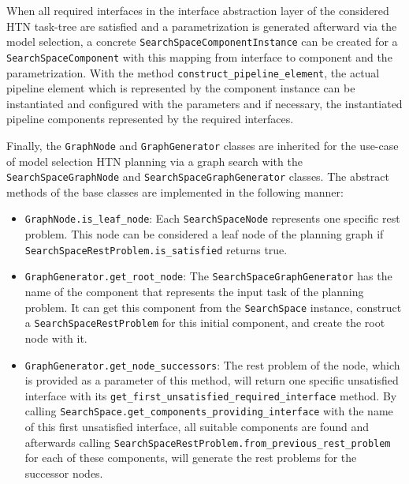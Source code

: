 When all required interfaces in the interface abstraction layer of the considered HTN task-tree are satisfied and a parametrization is generated afterward via the model selection, a concrete \texttt{SearchSpaceComponentInstance} can be created for a \texttt{SearchSpaceComponent} with this mapping from interface to component and the parametrization.
With the method \texttt{construct\_pipeline\_element}, the actual pipeline element which is represented by the component instance can be instantiated and configured with the parameters and if necessary, the instantiated pipeline components represented by the required interfaces.

Finally, the \texttt{GraphNode} and \texttt{GraphGenerator} classes are inherited for the use-case of model selection HTN planning via a graph search with the \texttt{SearchSpaceGraphNode} and \texttt{SearchSpaceGraphGenerator} classes.
The abstract methods of the base classes are implemented in the following manner:
\begin{itemize}
    \item \texttt{GraphNode.is\_leaf\_node}: Each \texttt{SearchSpaceNode} represents one specific rest problem.
    This node can be considered a leaf node of the planning graph if \texttt{SearchSpaceRestProblem.is\_satisfied} returns true.
    \item \texttt{GraphGenerator.get\_root\_node}: The \texttt{SearchSpaceGraphGenerator} has the name of the component that represents the input task of the planning problem.
    It can get this component from the \texttt{SearchSpace} instance, construct a \texttt{SearchSpaceRestProblem} for this initial component, and create the root node with it.
    \item \texttt{GraphGenerator.get\_node\_successors}: The rest problem of the node, which is provided as a parameter of this method, will return one specific unsatisfied interface with its \texttt{get\_first\_unsatisfied\_required\_interface} method.
    By calling \texttt{SearchSpace.get\_components\_providing\_interface} with the name of this first unsatisfied interface, all suitable components are found and afterwards calling \texttt{SearchSpaceRestProblem.from\_previous\_rest\_problem} for each of these components, will generate the rest problems for the successor nodes.
\end{itemize}

